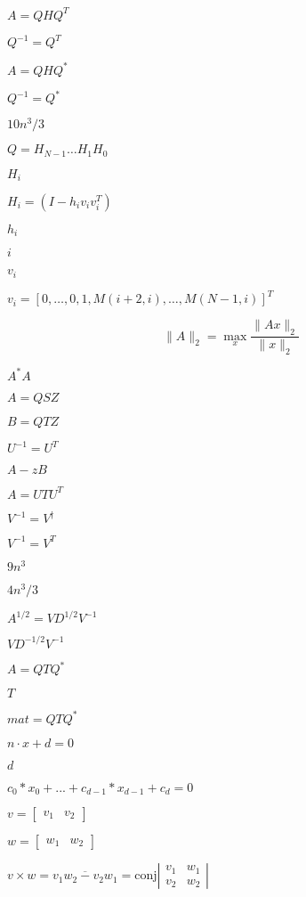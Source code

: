 \documentclass{article}
\begin{document}
$ A = Q H
Q^T $
\pagebreak

$ Q^{-1} = Q^T $
\pagebreak

$ A = Q H Q^* $
\pagebreak

$ Q^{-1} = Q^* $
\pagebreak

$ 10n^3/3 $
\pagebreak

$ Q = H_{N-1} \ldots H_1 H_0 $
\pagebreak

$ H_i $
\pagebreak

$ H_i = (I - h_i v_i v_i^T) $
\pagebreak

$ h_i $
\pagebreak

$ i $
\pagebreak

$ v_i $
\pagebreak

$ v_i = [ 0, \ldots, 0, 1, M(i+2,i), \ldots, M(N-1,i) ]^T $
\pagebreak

\[ \|A\|_2 = \max_x \frac{\|Ax\|_2}{\|x\|_2} \]
\pagebreak

$ A^*A $
\pagebreak

$ A = Q S Z $
\pagebreak

$ B = Q T Z $
\pagebreak

$ U^{-1} = U^T $
\pagebreak

$ A - z B $
\pagebreak

$ A = U T U^T $
\pagebreak

$ V^{-1} = V^{\dagger} $
\pagebreak

$ V^{-1} = V^T $
\pagebreak

$ 9n^3 $
\pagebreak

$ 4n^3/3 $
\pagebreak

$ A^{1/2} = V D^{1/2} V^{-1} $
\pagebreak

$ V D^{-1/2} V^{-1} $
\pagebreak

$ A = Q T Q^* $
\pagebreak

$ T $
\pagebreak

$ mat = Q T Q^* $
\pagebreak

$ n \cdot x + d = 0 $
\pagebreak

$ d $
\pagebreak

$ c_0*x_0 + ... + c_{d-1}*x_{d-1} + c_d = 0 $
\pagebreak

$ v = \begin{bmatrix} v_1 & v_2 \end{bmatrix} $
\pagebreak

$ w = \begin{bmatrix} w_1 & w_2 \end{bmatrix}
$
\pagebreak

$ v\times w = \overline{v_1 w_2 - v_2 w_1} = \text{conj}\left|\begin{smallmatrix} v_1 &
w_1 \\ v_2 & w_2 \end{smallmatrix}\right| $
\pagebreak
\end{document}
